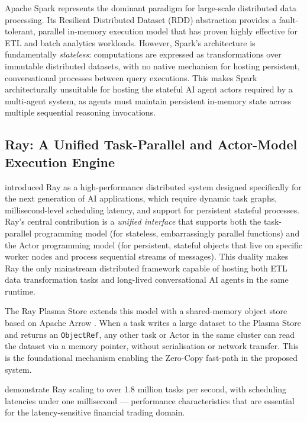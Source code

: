 \documentclass[12pt, a4paper]{report}
\begin{document}
Apache Spark \citep{zaharia2012resilient} represents the dominant paradigm for large-scale
distributed data processing. Its Resilient Distributed Dataset (RDD) abstraction provides
a fault-tolerant, parallel in-memory execution model that has proven highly effective for
ETL and batch analytics workloads.
However, Spark's architecture is fundamentally \emph{stateless}: computations are
expressed as transformations over immutable distributed datasets, with no native
mechanism for hosting persistent, conversational processes between query executions.
This makes Spark architecturally unsuitable for hosting the stateful AI agent actors
required by a multi-agent system, as agents must maintain persistent in-memory state
across multiple sequential reasoning invocations.

\subsection{Ray: A Unified Task-Parallel and Actor-Model Execution Engine}
\label{ssec:ray}

\citet{moritz2018ray} introduced Ray as a high-performance distributed system designed
specifically for the next generation of AI applications, which require dynamic task
graphs, millisecond-level scheduling latency, and support for persistent stateful
processes.
Ray's central contribution is a \emph{unified interface} that supports both the
task-parallel programming model (for stateless, embarrassingly parallel functions) and
the Actor programming model (for persistent, stateful objects that live on specific
worker nodes and process sequential streams of messages).
This duality makes Ray the only mainstream distributed framework capable of hosting both
ETL data transformation tasks and long-lived conversational AI agents in the same runtime.

The Ray Plasma Store extends this model with a shared-memory object store based on
Apache Arrow \citep{arrow_github}. When a task writes a large dataset to the Plasma
Store and returns an \texttt{ObjectRef}, any other task or Actor in the same cluster can
read the dataset via a memory pointer, without serialisation or network transfer.
This is the foundational mechanism enabling the Zero-Copy fast-path in the proposed
system.

\citet{moritz2018ray} demonstrate Ray scaling to over 1.8 million tasks per second,
with scheduling latencies under one millisecond — performance characteristics that are
essential for the latency-sensitive financial trading domain.
\end{document}
